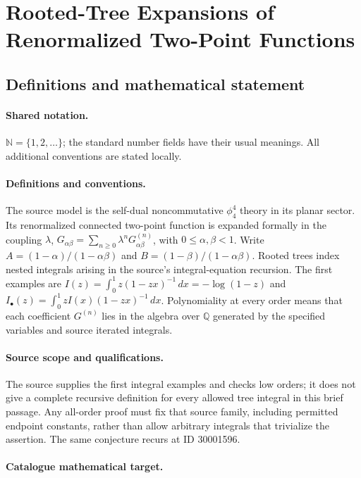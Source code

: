 \documentclass[11pt]{article}
\begin{document}
\section{Rooted-Tree Expansions of Renormalized Two-Point Functions}\label{statement}

\subsection{Definitions and mathematical statement}

\paragraph{Shared notation.}$\mathbb N=\{1,2,\ldots\}$; the standard number fields have their usual meanings. All additional conventions are stated locally.


\paragraph{Definitions and conventions.} The source model is the self-dual noncommutative $\phi^4_4$ theory in its planar sector. Its renormalized connected two-point function is expanded formally in the coupling $\lambda$, $G_{\alpha\beta}=\sum_{n\ge0}\lambda^nG^{(n)}_{\alpha\beta}$, with $0\le\alpha,\beta<1$. Write $A=(1-\alpha)/(1-\alpha\beta)$ and $B=(1-\beta)/(1-\alpha\beta)$. Rooted trees index nested integrals arising in the source's integral-equation recursion. The first examples are $I(z)=\int_0^1 z(1-zx)^{-1}\,dx=-\log(1-z)$ and $I_\bullet(z)=\int_0^1 zI(x)(1-zx)^{-1}\,dx$. Polynomiality at every order means that each coefficient $G^{(n)}$ lies in the algebra over $\mathbb Q$ generated by the specified variables and source iterated integrals.

\paragraph{Source scope and qualifications.} The source supplies the first integral examples and checks low orders; it does not give a complete recursive definition for every allowed tree integral in this brief passage. Any all-order proof must fix that source family, including permitted endpoint constants, rather than allow arbitrary integrals that trivialize the assertion. The same conjecture recurs at ID 30001596.

\paragraph{Catalogue mathematical target.}
\end{document}
